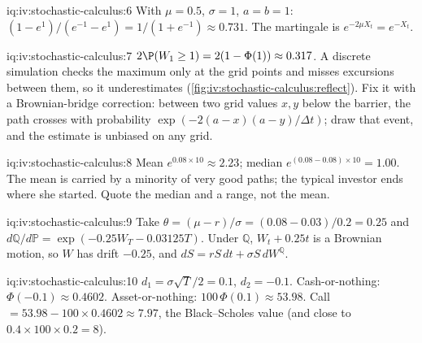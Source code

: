 \begin{solution}{iq:iv:stochastic-calculus:6}
With $\mu = 0.5$, $\sigma = 1$, $a = b = 1$: $(1 - e^{1})/(e^{-1} - e^{1}) = 1/(1 + e^{-1}) \approx 0.731$. The
martingale is $e^{-2\mu X_t} = e^{-X_t}$.
\end{solution}

\begin{solution}{iq:iv:stochastic-calculus:7}
$2\P(W_1 \ge 1) = 2(1 - \Phi(1)) \approx 0.317$. A discrete simulation checks the maximum only at the grid points and misses
excursions between them, so it underestimates (\cref{fig:iv:stochastic-calculus:reflect}). Fix it with a Brownian-bridge
correction: between two grid values $x, y$ below the barrier, the path crosses with probability $\exp(-2(a - x)(a - y)/\Delta
t)$; draw that event, and the estimate is unbiased on any grid.
\end{solution}

\begin{solution}{iq:iv:stochastic-calculus:8}
Mean $e^{0.08 \times 10} \approx 2.23$; median $e^{(0.08 - 0.08) \times 10} = 1.00$. The mean is carried by a minority of very
good paths; the typical investor ends where she started. Quote the median and a range, not the mean.
\end{solution}

\begin{solution}{iq:iv:stochastic-calculus:9}
Take $\theta = (\mu - r)/\sigma = (0.08 - 0.03)/0.2 = 0.25$ and $d\mathbb Q/d\mathbb P = \exp(-0.25 W_T - 0.03125T)$. Under
$\mathbb Q$, $W_t + 0.25t$ is a Brownian motion, so $W$ has drift $-0.25$, and $dS = rS\,dt + \sigma S\,dW^{\mathbb Q}$.
\end{solution}

\begin{solution}{iq:iv:stochastic-calculus:10}
$d_1 = \sigma\sqrt T/2 = 0.1$, $d_2 = -0.1$. Cash-or-nothing: $\Phi(-0.1) \approx 0.4602$. Asset-or-nothing: $100\,\Phi(0.1)
\approx 53.98$. Call $= 53.98 - 100 \times 0.4602 \approx 7.97$, the Black--Scholes value (and close to $0.4 \times 100
\times 0.2 = 8$).
\end{solution}

